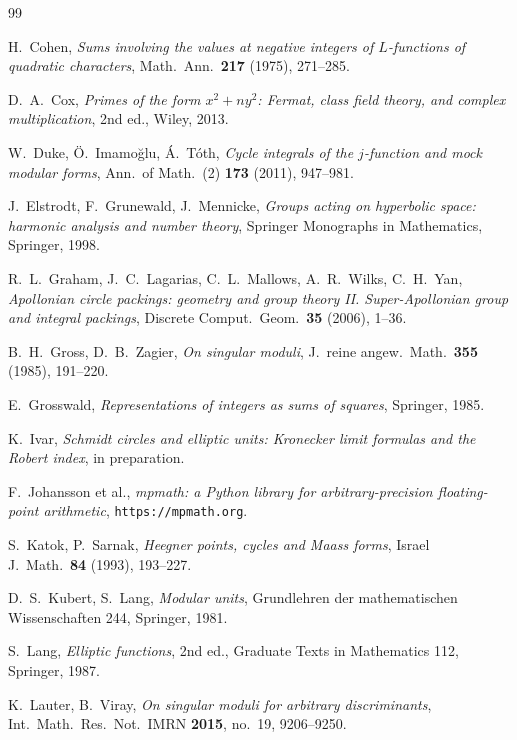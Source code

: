 \documentclass[11pt]{amsart}
\numberwithin{equation}{section}
\theoremstyle{plain}
\theoremstyle{definition}
\theoremstyle{remark}
\begin{document}
\begin{thebibliography}{99}

H.~Cohen,
\emph{Sums involving the values at negative integers of $L$-functions
of quadratic characters},
Math.\ Ann.\ \textbf{217} (1975), 271--285.

D.~A.~Cox,
\emph{Primes of the form $x^2 + ny^2$: Fermat, class field theory,
and complex multiplication},
2nd ed., Wiley, 2013.

W.~Duke, \"O.~Imamo\u{g}lu, \'A.~T\'oth,
\emph{Cycle integrals of the $j$-function and mock modular forms},
Ann.\ of Math.\ (2) \textbf{173} (2011), 947--981.

J.~Elstrodt, F.~Grunewald, J.~Mennicke,
\emph{Groups acting on hyperbolic space: harmonic analysis and number
theory},
Springer Monographs in Mathematics, Springer, 1998.

R.~L.~Graham, J.~C.~Lagarias, C.~L.~Mallows, A.~R.~Wilks,
C.~H.~Yan,
\emph{Apollonian circle packings: geometry and group theory II.
Super-Apollonian group and integral packings},
Discrete Comput.\ Geom.\ \textbf{35} (2006), 1--36.

B.~H.~Gross, D.~B.~Zagier,
\emph{On singular moduli},
J.\ reine angew.\ Math.\ \textbf{355} (1985), 191--220.

E.~Grosswald,
\emph{Representations of integers as sums of squares},
Springer, 1985.

K.~Ivar,
\emph{Schmidt circles and elliptic units: Kronecker limit formulas
and the Robert index},
in preparation.

F.~Johansson et al.,
\emph{mpmath: a Python library for arbitrary-precision floating-point
arithmetic}, \texttt{https://mpmath.org}.

S.~Katok, P.~Sarnak,
\emph{Heegner points, cycles and Maass forms},
Israel J.\ Math.\ \textbf{84} (1993), 193--227.

D.~S.~Kubert, S.~Lang,
\emph{Modular units},
Grundlehren der mathematischen Wissenschaften 244, Springer, 1981.

S.~Lang,
\emph{Elliptic functions},
2nd ed., Graduate Texts in Mathematics 112, Springer, 1987.

K.~Lauter, B.~Viray,
\emph{On singular moduli for arbitrary discriminants},
Int.\ Math.\ Res.\ Not.\ IMRN \textbf{2015}, no.\ 19, 9206--9250.


\end{thebibliography}
\end{document}
